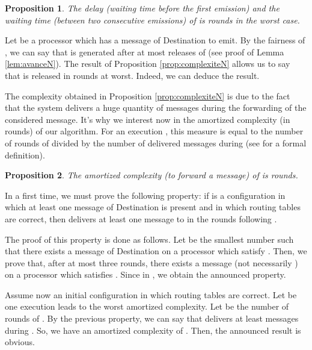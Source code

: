 \documentclass[11pt]{article}
\newtheorem{proposition}{Proposition}
\newenvironment{sketchproof}{{\noindent\bf Sketch of proof. } }{{\hfill }}
\begin{document}
\begin{proposition} \label{prop:delaiN}
The delay (waiting time before the first emission) and the waiting time (between two consecutive emissions) of \AN is  rounds in the worst case.
\end{proposition}

\begin{sketchproof}
Let  be a processor which has a message of Destination  to emit. By the fairness of , we can say that  is generated after at most  releases of  (see proof of Lemma \ref{lem:avanceN}). The result of Proposition \ref{prop:complexiteN} allows us to say that  is released in  rounds at worst. Indeed, we can deduce the result.
\end{sketchproof}

The complexity obtained in Proposition \ref{prop:complexiteN} is due to the fact that the system delivers a huge quantity of messages during the forwarding of the considered message. It's why we interest now in the amortized complexity (in rounds) of our algorithm. For an execution , this measure is equal to the number of rounds of  divided by the number of delivered messages during  (see \cite{CLRS02} for a formal definition).

\begin{proposition} \label{prop:amortieN}
The amortized complexity (to forward a message) of \AN is   rounds.
\end{proposition}

\begin{sketchproof}
In a first time, we must prove the following property: if  is a configuration in which at least one message of Destination  is present and in which routing tables are correct, then \AN delivers at least one message to  in the  rounds following . 

The proof of this property is done as follows. Let  be the smallest number such that there exists a message of Destination  on a processor  which satisfy . Then, we prove that, after at most three rounds, there exists a message (not necessarily ) on a processor  which satisfies . Since  in , we obtain the announced property.
 
Assume now an initial configuration in which routing tables are correct. Let  be one execution leads to the worst amortized complexity. Let  be the number of rounds of . By the previous property, we can say that \AN delivers at least  messages during . So, we have an amortized complexity of . Then, the announced result is obvious.
\end{sketchproof}
\end{document}
